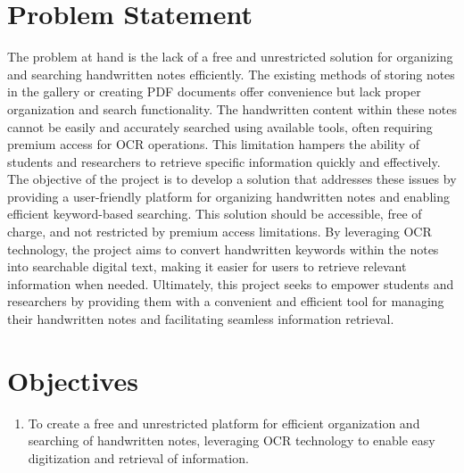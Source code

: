 \section{Problem Statement}
The problem at hand is the lack of a free and unrestricted solution for organizing and
searching handwritten notes efficiently. The existing methods of storing notes in the
gallery or creating PDF documents offer convenience but lack proper organization and
search functionality. The handwritten content within these notes cannot be easily and
accurately searched using available tools, often requiring premium access for OCR
operations. This limitation hampers the ability of students and researchers to retrieve
specific information quickly and effectively.\\
The objective of the project is to develop a solution that addresses these issues by
providing a user-friendly platform for organizing handwritten notes and enabling efficient
keyword-based searching. This solution should be accessible, free of charge, and not
restricted by premium access limitations. By leveraging OCR technology, the project
aims to convert handwritten keywords within the notes into searchable digital text,
making it easier for users to retrieve relevant information when needed. Ultimately, this
project seeks to empower students and researchers by providing them with a convenient
and efficient tool for managing their handwritten notes and facilitating seamless
information retrieval.

\section{Objectives}
\begin{enumerate}[label=\roman*]
    \item To create a free and unrestricted platform for efficient organization and searching
    of handwritten notes, leveraging OCR technology to enable easy digitization and
    retrieval of information.
\end{enumerate}

